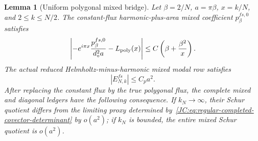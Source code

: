 \documentclass[11pt]{amsart}
\numberwithin{equation}{section}
\newtheorem{lemma}[theorem]{Lemma}
\theoremstyle{definition}
\theoremstyle{remark}
\begin{document}
\begin{lemma}[Uniform polygonal mixed bridge]
\label{JC:lem:regular-mixed-uniform-bridge}
Let $\beta=2/N$, $a=\pi\beta$, $x=k/N$, and
$2\le k\le N/2$.  The constant-flux harmonic-plus-area mixed coefficient
$p^{fs,0}_{\beta}$ satisfies
\begin{equation}\label{JC:eq:regular-mixed-CF2P}
 \left|-e^{i\pi x}\frac{p^{fs,0}_{\beta}}{d_\circ^2a}
       -L_{\rm poly}(x)\right|
 \le C\left(\beta+\frac{\beta^2}{x}\right).
\end{equation}
The actual reduced Helmholtz-minus-harmonic mixed modal row satisfies
\begin{equation}\label{JC:eq:regular-mixed-RR-ABS}
 \boxed{|E^{fs}_{N,k}|\le C_pa^2.}
\end{equation}
After replacing the constant flux by the true polygonal flux, the complete
mixed and diagonal ledgers have the following consequence.  If $k_N\to
\infty$, their Schur quotient differs from the limiting proxy determined
by~\eqref{JC:eq:regular-completed-covector-determinant} by $o(a^2)$; if
$k_N$ is bounded, the entire mixed Schur quotient is $o(a^2)$.
\end{lemma}
\end{document}
